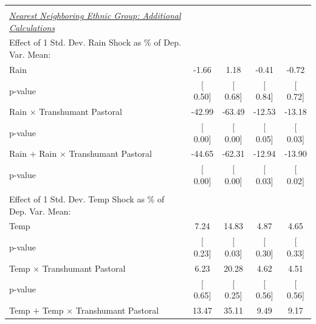 {\begin{tabular}{l*{4}{c}}
\midrule
\\ \underline{\emph{Nearest Neighboring Ethnic Group: Additional Calculations}} &               &               &               &               \\
[1em] Effect of 1 Std. Dev. Rain Shock as $\%$ of Dep. Var. Mean:&               &               &               &               \\
\hspace{15pt} Rain  & -1.66         &  1.18         & -0.41         & -0.72         \\
\hspace{15pt} p-value&[     0.50]         &[     0.68]         &[     0.84]         &[     0.72]         \\
[1em] \hspace{15pt} Rain $\times$ Transhumant Pastoral&-42.99         &-63.49         &-12.53         &-13.18         \\
\hspace{15pt} p-value&[     0.00]         &[     0.00]         &[     0.05]         &[     0.03]         \\
[1em]  \hspace{15pt} Rain $+$ Rain $\times$ Transhumant Pastoral&-44.65         &-62.31         &-12.94         &-13.90         \\
\hspace{15pt} p-value&[     0.00]         &[     0.00]         &[     0.03]         &[     0.02]         \\
\\ [1em] Effect of 1 Std. Dev. Temp Shock as $\%$ of Dep. Var. Mean:&               &               &               &               \\
\hspace{15pt} Temp  &  7.24         & 14.83         &  4.87         &  4.65         \\
\hspace{15pt} p-value&[     0.23]         &[     0.03]         &[     0.30]         &[     0.33]         \\
[1em] \hspace{15pt} Temp $\times$ Transhumant Pastoral&  6.23         & 20.28         &  4.62         &  4.51         \\
\hspace{15pt} p-value&[     0.65]         &[     0.25]         &[     0.56]         &[     0.56]         \\
[1em]  \hspace{15pt} Temp $+$ Temp $\times$ Transhumant Pastoral& 13.47         & 35.11         &  9.49         &  9.17         \\

\end{tabular}}
